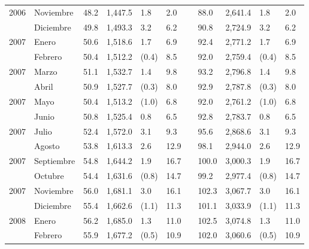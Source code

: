 \begin{center}
\begin{longtable}{llp{1.1cm}p{1.2cm}p{1.2cm}p{1.2cm}rp{1.2cm}p{1.2cm}p{1.2cm}p{1.2cm}}
		\multicolumn{1}{l}{	2006	}&	Noviembre	&	 48.2 	&	 1,447.5 	&	 1.8 	&	 2.0 	&  &	 88.0 	&	 2,641.4 	&	 1.8 	&	 2.0 	\\
		\rowcolor{color1!5!white}\multicolumn{1}{l}{	2006	}&	Diciembre	&	 49.8 	&	 1,493.3 	&	 3.2 	&	 6.2 	&  &	 90.8 	&	 2,724.9 	&	 3.2 	&	 6.2 	\\
		\multicolumn{1}{l}{	2007	}&	Enero	&	 50.6 	&	 1,518.6 	&	 1.7 	&	 6.9 	&  &	 92.4 	&	 2,771.2 	&	 1.7 	&	 6.9 	\\
		\rowcolor{color1!5!white}\multicolumn{1}{l}{	2007	}&	Febrero	&	 50.4 	&	 1,512.2 	&	 (0.4)	&	 8.5 	&  &	 92.0 	&	 2,759.4 	&	 (0.4)	&	 8.5 	\\
		\multicolumn{1}{l}{	2007	}&	Marzo	&	 51.1 	&	 1,532.7 	&	 1.4 	&	 9.8 	&  &	 93.2 	&	 2,796.8 	&	 1.4 	&	 9.8 	\\
		\rowcolor{color1!5!white}\multicolumn{1}{l}{	2007	}&	Abril	&	 50.9 	&	 1,527.7 	&	 (0.3)	&	 8.0 	&  &	 92.9 	&	 2,787.8 	&	 (0.3)	&	 8.0 	\\
		\multicolumn{1}{l}{	2007	}&	Mayo	&	 50.4 	&	 1,513.2 	&	 (1.0)	&	 6.8 	&  &	 92.0 	&	 2,761.2 	&	 (1.0)	&	 6.8 	\\
		\rowcolor{color1!5!white}\multicolumn{1}{l}{	2007	}&	Junio	&	 50.8 	&	 1,525.4 	&	 0.8 	&	 6.5 	&  &	 92.8 	&	 2,783.7 	&	 0.8 	&	 6.5 	\\
		\multicolumn{1}{l}{	2007	}&	Julio	&	 52.4 	&	 1,572.0 	&	 3.1 	&	 9.3 	&  &	 95.6 	&	 2,868.6 	&	 3.1 	&	 9.3 	\\
		\rowcolor{color1!5!white}\multicolumn{1}{l}{	2007	}&	Agosto	&	 53.8 	&	 1,613.3 	&	 2.6 	&	 12.9 	&  &	 98.1 	&	 2,944.0 	&	 2.6 	&	 12.9 	\\
		\multicolumn{1}{l}{	2007	}&	Septiembre	&	 54.8 	&	 1,644.2 	&	 1.9 	&	 16.7 	&  &	 100.0 	&	 3,000.3 	&	 1.9 	&	 16.7 	\\
		\rowcolor{color1!5!white}\multicolumn{1}{l}{	2007	}&	Octubre	&	 54.4 	&	 1,631.6 	&	 (0.8)	&	 14.7 	&  &	 99.2 	&	 2,977.4 	&	 (0.8)	&	 14.7 	\\
		\multicolumn{1}{l}{	2007	}&	Noviembre	&	 56.0 	&	 1,681.1 	&	 3.0 	&	 16.1 	&  &	 102.3 	&	 3,067.7 	&	 3.0 	&	 16.1 	\\
		\rowcolor{color1!5!white}\multicolumn{1}{l}{	2007	}&	Diciembre	&	 55.4 	&	 1,662.6 	&	 (1.1)	&	 11.3 	&  &	 101.1 	&	 3,033.9 	&	 (1.1)	&	 11.3 	\\
		\multicolumn{1}{l}{	2008	}&	Enero	&	 56.2 	&	 1,685.0 	&	 1.3 	&	 11.0 	&  &	 102.5 	&	 3,074.8 	&	 1.3 	&	 11.0 	\\
		\rowcolor{color1!5!white}\multicolumn{1}{l}{	2008	}&	Febrero	&	 55.9 	&	 1,677.2 	&	 (0.5)	&	 10.9 	&  &	 102.0 	&	 3,060.6 	&	 (0.5)	&	 10.9 	\\

\end{longtable}
\end{center}

